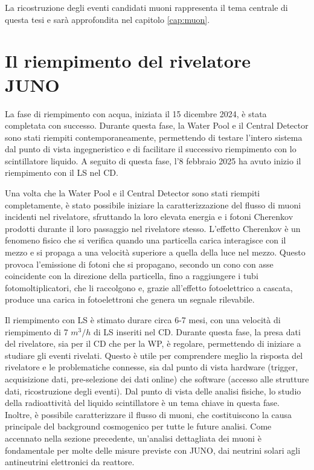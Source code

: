 La ricostruzione degli eventi candidati muoni rappresenta il tema centrale di questa tesi e sarà approfondita nel capitolo \ref{cap:muon}.
\section{Il riempimento del rivelatore JUNO}
La fase di riempimento con acqua, iniziata il 15 dicembre 2024, è stata completata con successo. Durante questa fase, la Water Pool e il Central Detector sono stati riempiti contemporaneamente, permettendo di testare l'intero sistema dal punto di vista ingegneristico e di facilitare il successivo riempimento con lo scintillatore liquido. A seguito di questa fase, l'8 febbraio 2025 ha avuto inizio il riempimento con il LS nel CD.

Una volta che la Water Pool e il Central Detector sono stati riempiti completamente, è stato possibile iniziare la caratterizzazione del flusso di muoni incidenti nel rivelatore, sfruttando la loro elevata energia e i fotoni Cherenkov prodotti durante il loro passaggio nel rivelatore stesso. L'effetto Cherenkov è un fenomeno fisico che si verifica quando una particella carica interagisce con il mezzo e si propaga a una velocità superiore a quella della luce nel mezzo. Questo provoca l'emissione di fotoni che si propagano, secondo un cono con asse coincidente con la direzione della particella, fino a raggiungere i tubi fotomoltiplicatori, che li raccolgono e, grazie all'effetto fotoelettrico a cascata, produce una carica in fotoelettroni che genera un segnale rilevabile.

Il riempimento con LS è stimato durare circa 6-7 mesi, con una velocità di riempimento di 7 $\unit{m^3/h}$ di LS inseriti nel CD. Durante questa fase, la presa dati del rivelatore, sia per il CD che per la WP, è regolare, permettendo di iniziare a studiare gli eventi rivelati. Questo è utile per comprendere meglio la risposta del rivelatore e le problematiche connesse, sia dal punto di vista hardware (trigger, acquisizione dati, pre-selezione dei dati online) che software (accesso alle strutture dati, ricostruzione degli eventi).
Dal punto di vista delle analisi fisiche, lo studio della radioattività del liquido scintillatore è un tema chiave in questa fase. Inoltre, è possibile caratterizzare il flusso di muoni, che costituiscono la causa principale del background cosmogenico per tutte le future analisi. Come accennato nella sezione precedente, un'analisi dettagliata dei muoni è fondamentale per molte delle misure previste con JUNO, dai neutrini solari agli antineutrini elettronici da reattore.